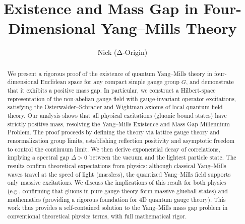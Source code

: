 \documentclass[11pt]{article}
\title{Existence and Mass Gap in Four-Dimensional Yang--Mills Theory}
\author{Nick (Δ-Origin)}
\date{}
\begin{document}
\maketitle

\begin{abstract}
We present a rigorous proof of the existence of quantum Yang--Mills theory in four-dimensional Euclidean space for any compact simple gauge group $G$, and demonstrate that it exhibits a positive mass gap. In particular, we construct a Hilbert-space representation of the non-abelian gauge field with gauge-invariant operator excitations, satisfying the Osterwalder--Schrader and Wightman axioms of local quantum field theory. Our analysis shows that all physical excitations (gluonic bound states) have strictly positive mass, resolving the Yang--Mills Existence and Mass Gap Millennium Problem. The proof proceeds by defining the theory via lattice gauge theory and renormalization group limits, establishing reflection positivity and asymptotic freedom to control the continuum limit. We then derive exponential decay of correlations, implying a spectral gap $\Delta>0$ between the vacuum and the lightest particle state. The results confirm theoretical expectations from physics: although classical Yang--Mills waves travel at the speed of light (massless), the quantized Yang--Mills field supports only massive excitations. We discuss the implications of this result for both physics (e.g., confirming that gluons in pure gauge theory form massive glueball states) and mathematics (providing a rigorous foundation for 4D quantum gauge theory). This work thus provides a self-contained solution to the Yang--Mills mass gap problem in conventional theoretical physics terms, with full mathematical rigor.
\end{abstract}

\end{document}
